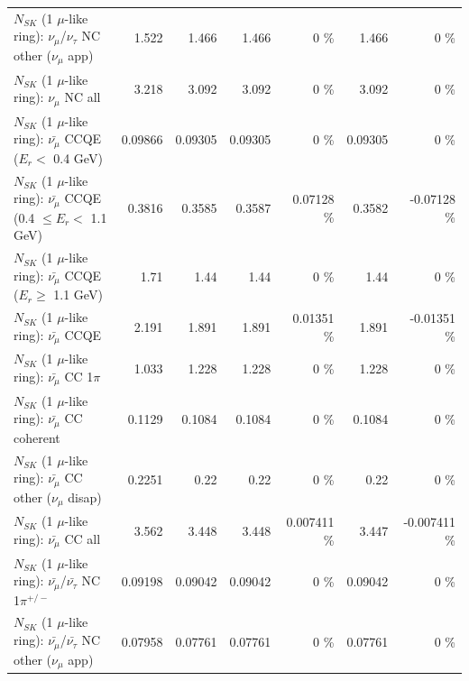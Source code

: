 \begin{table}
\begin{tabular}{| l | r | r | r  r | r  r |}
     $N_{SK}$ (1 $\mu$-like ring): $\nu_\mu$/$\nu_\tau$ NC other ($\nu_\mu$ app) &           1.522 &           1.466 &           1.466 &        0 \%  &           1.466 &        0 \%  \\ 
                                $N_{SK}$ (1 $\mu$-like ring): $\nu_{\mu}$ NC all &           3.218 &           3.092 &           3.092 &        0 \%  &           3.092 &        0 \%  \\ 
\hline
\hline
\hline
          $N_{SK}$ (1 $\mu$-like ring): $\bar{\nu_\mu}$ CCQE ($E_{r} <$ 0.4 GeV) &         0.09866 &         0.09305 &         0.09305 &        0 \%  &         0.09305 &        0 \%  \\ 
 $N_{SK}$ (1 $\mu$-like ring): $\bar{\nu_\mu}$ CCQE (0.4 $\leq E_{r} <$ 1.1 GeV) &          0.3816 &          0.3585 &          0.3587 &  0.07128 \%  &          0.3582 & -0.07128 \%  \\ 
       $N_{SK}$ (1 $\mu$-like ring): $\bar{\nu_\mu}$ CCQE ($E_{r} \geq$ 1.1 GeV) &            1.71 &            1.44 &            1.44 &        0 \%  &            1.44 &        0 \%  \\ 
\hline
                              $N_{SK}$ (1 $\mu$-like ring): $\bar{\nu_\mu}$ CCQE &           2.191 &           1.891 &           1.891 &  0.01351 \%  &           1.891 & -0.01351 \%  \\ 
                         $N_{SK}$ (1 $\mu$-like ring): $\bar{\nu_\mu}$ CC 1$\pi$ &           1.033 &           1.228 &           1.228 &        0 \%  &           1.228 &        0 \%  \\ 
                       $N_{SK}$ (1 $\mu$-like ring): $\bar{\nu_\mu}$ CC coherent &          0.1129 &          0.1084 &          0.1084 &        0 \%  &          0.1084 &        0 \%  \\ 
        $N_{SK}$ (1 $\mu$-like ring): $\bar{\nu_\mu}$ CC other ($\nu_\mu$ disap) &          0.2251 &            0.22 &            0.22 &        0 \%  &            0.22 &        0 \%  \\ 
                          $N_{SK}$ (1 $\mu$-like ring): $\bar{\nu_{\mu}}$ CC all &           3.562 &           3.448 &           3.448 & 0.007411 \%  &           3.447 & -0.007411 \%  \\ 
\hline
  $N_{SK}$ (1 $\mu$-like ring): $\bar{\nu_\mu}$/$\bar{\nu_\tau}$ NC 1$\pi^{+/-}$ &         0.09198 &         0.09042 &         0.09042 &        0 \%  &         0.09042 &        0 \%  \\ 
$N_{SK}$ (1 $\mu$-like ring): $\bar{\nu_\mu}$/$\bar{\nu_\tau}$ NC other ($\nu_\mu$ app) &         0.07958 &         0.07761 &         0.07761 &        0 \%  &         0.07761 &        0 \%  \\ 

\end{tabular}
\end{table}
